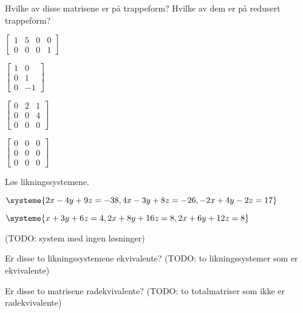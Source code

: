 
\begin{oppgave}
Hvilke av disse matrisene er på trappeform?  Hvilke av dem er på
redusert trappeform?
\begin{punkt}
$
\begin{bmatrix}
1 & 5 & 0 & 0 \\
0 & 0 & 0 & 1
\end{bmatrix}
$
\end{punkt}
\begin{punkt}
$
\begin{bmatrix}
1 & 0 \\
0 & 1 \\
0 & -1
\end{bmatrix}
$
\end{punkt}
\begin{punkt}
$
\begin{bmatrix}
0 & 2 & 1 \\
0 & 0 & 4 \\
0 & 0 & 0
\end{bmatrix}
$
\end{punkt}
\begin{punkt}
$
\begin{bmatrix}
0 & 0 & 0 \\
0 & 0 & 0 \\
0 & 0 & 0
\end{bmatrix}
$
\end{punkt}
\end{oppgave}


\begin{oppgave}
Løs likningssystemene.
\begin{punkt}
$
\systeme{
  2x - 4y + 9z = -38,
  4x - 3y + 8z = -26,
 -2x + 4y - 2z =  17
}
$
\end{punkt}
\begin{punkt}
$
\systeme{
  x + 3y +  6z = 4,
 2x + 8y + 16z = 8,
 2x + 6y + 12z = 8
}
$
\end{punkt}
\begin{punkt}
(TODO: system med ingen løsninger)
\end{punkt}
\end{oppgave}


\begin{oppgave}
\begin{punkt}
Er disse to likningssystemene ekvivalente?
(TODO: to likningssystemer som er ekvivalente)
\end{punkt}
\begin{punkt}
Er disse to matrisene radekvivalente?
(TODO: to totalmatriser som ikke er radekvivalente)
\end{punkt}
\end{oppgave}


